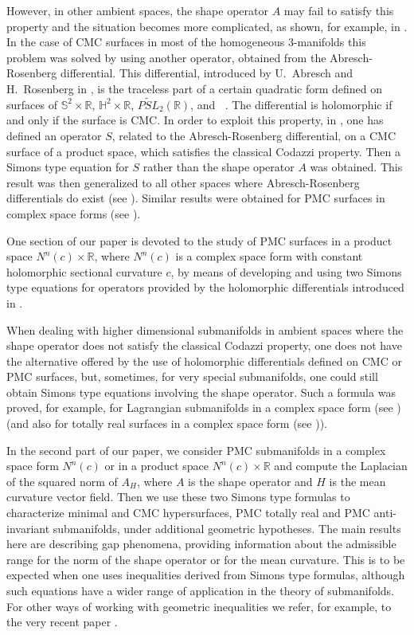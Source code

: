 \documentclass[11pt]{amsart}
\theoremstyle{plain}
\theoremstyle{definition}
\DeclareMathOperator{\nil}{Nil_3}
\numberwithin{equation}{section}
\begin{document}
However, in other ambient spaces, the shape operator $A$ may fail to satisfy this property and the situation becomes more complicated, as shown, for example, in \cite{B}. In the case of CMC surfaces in most of the homogeneous $3$-manifolds this problem was solved by using another operator, obtained from the Abresch-Rosenberg differential. This differential, introduced by U.~Abresch and H.~Rosenberg in \cite{AR,AR2} , is the traceless part of a certain quadratic form defined on surfaces of $\mathbb{S}^2\times\mathbb{R}$, $\mathbb{H}^2\times\mathbb{R}$, $\widetilde{PSL}_2(\mathbb{R})$, and $\nil$. The differential is holomorphic if and only if the surface is CMC. In order to exploit this property, in \cite{B}, one has defined an operator $S$, related to the Abresch-Rosenberg differential, on a CMC surface of a product space, which satisfies the classical Codazzi property. Then a Simons type equation for $S$ rather than the shape operator $A$ was obtained. This result was then generalized to all other spaces where Abresch-Rosenberg differentials do exist (see \cite{ET}). Similar results were obtained for PMC surfaces in complex space forms (see \cite{FP}). 

One section of our paper is devoted to the study of PMC surfaces in a product space $N^n(c)\times\mathbb{R}$, where $N^n(c)$ is a complex space form with constant holomorphic sectional curvature $c$, by means of developing and using two Simons type equations for operators provided by the holomorphic differentials introduced in \cite{FR-TAMS}.

When dealing with higher dimensional submanifolds in ambient spaces where the shape operator does not satisfy the classical Codazzi property, one does not have the alternative offered by the use of holomorphic differentials defined on CMC or PMC surfaces, but, sometimes, for very special submanifolds, one could still obtain Simons type equations involving the shape operator. Such a formula was proved, for example, for Lagrangian submanifolds in a complex space form (see \cite{Chen77}) (and also for totally real surfaces in a complex space form (see \cite{Chen74})). 

In the second part of our paper, we consider PMC submanifolds in a complex space form $N^n(c)$ or in a product space $N^n(c)\times\mathbb{R}$ and compute the Laplacian of the squared norm of $A_H$, where $A$ is the shape operator and $H$ is the mean curvature vector field. Then we use these two Simons type formulas to characterize minimal and CMC hypersurfaces, PMC totally real and PMC anti-invariant submanifolds, under additional geometric hypotheses. The main results here are describing gap phenomena, providing information about the admissible range for the norm of the shape operator or for the mean curvature. This is to be expected when one uses inequalities derived from Simons type formulas, although such equations have a wider range of application in the theory of submanifolds. For other ways of working with geometric inequalities we refer, for example, to the very recent paper \cite{NG}.
\end{document}
